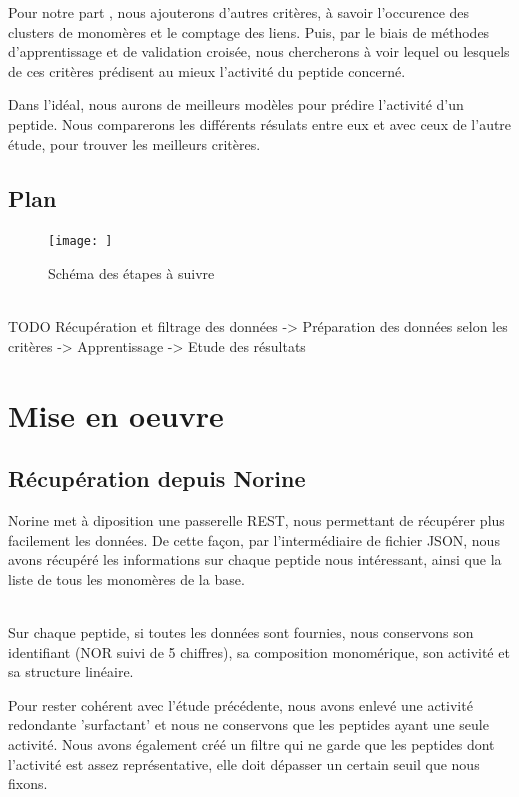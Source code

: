 \documentclass[a4paper,10pt]{report}
\begin{document}
	  Pour notre part , nous ajouterons d'autres critères, à savoir l'occurence des clusters de monomères et le comptage des liens.
	  Puis, par le biais de méthodes d'apprentissage et de validation croisée, nous chercherons à voir lequel ou lesquels de ces critères prédisent au mieux l'activité du peptide concerné.
	  
	  Dans l'idéal, nous aurons de meilleurs modèles pour prédire l'activité d'un peptide. Nous comparerons les différents résulats entre eux et avec ceux de l'autre étude, pour trouver les meilleurs critères.
	
	
      \section{Plan}
	
	\begin{figure}[h]
	  \caption{Schéma des étapes à suivre}
	  \texttt{[image: ]}
	\end{figure}
	  \\TODO  Récupération et filtrage des données -> Préparation des données selon les critères -> Apprentissage -> Etude des résultats 
   
  \chapter{Mise en oeuvre}

  
    \section{Récupération depuis Norine}
    
	Norine met à diposition une passerelle REST, nous permettant de récupérer plus facilement les données.
	De cette façon, par l'intermédiaire de fichier JSON, nous avons récupéré les informations sur chaque peptide nous intéressant, ainsi que la liste de tous les monomères de la base.
	
	    
	~\\ Sur chaque peptide, si toutes les données sont fournies, nous conservons son identifiant (NOR suivi de 5 chiffres), sa composition monomérique, son activité et sa structure linéaire. 
	    
	Pour rester cohérent avec l'étude précédente, nous avons enlevé une activité redondante 'surfactant' et nous ne conservons que les peptides ayant une seule activité.
	Nous avons également créé un filtre qui ne garde que les peptides dont l'activité est assez représentative, elle doit dépasser un certain seuil que nous fixons.
      
\end{document}
